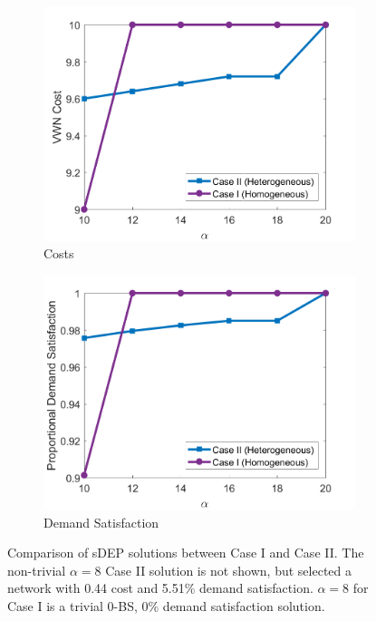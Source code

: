\documentclass[12pt,dvipsnames]{report}
\begin{document}
\begin{figure}[htp]
	\centering
	\begin{subfigure}{.49\textwidth}
		\centering
		\includegraphics[width=1\linewidth]{Figures/CaseII_sDEPComparisonCostCaseI}
		\caption{\small Costs}
		\label{fig:CaseII_sDEPComparisonCostCaseI}
	\end{subfigure} \hfill
	\begin{subfigure}{.49\textwidth}
		\centering
		\includegraphics[width=1\linewidth]{Figures/CaseII_sDEPComparisonSatCaseI}
		\caption{\small Demand Satisfaction}
		\label{fig:CaseII_sDEPComparisonSatCaseI}
	\end{subfigure}
	\caption[Comparison of sDEP solutions between Case I and Case II]{Comparison of sDEP solutions between Case I and Case II.  The non-trivial $\alpha = 8$ Case II solution is not shown, but selected a network with 0.44 cost and 5.51\% demand satisfaction. $\alpha = 8$ for Case I is a trivial 0-BS, 0\% demand satisfaction solution.}
	\label{fig:CaseII_sDEPComparisonsCaseI}
\end{figure}
\end{document}
